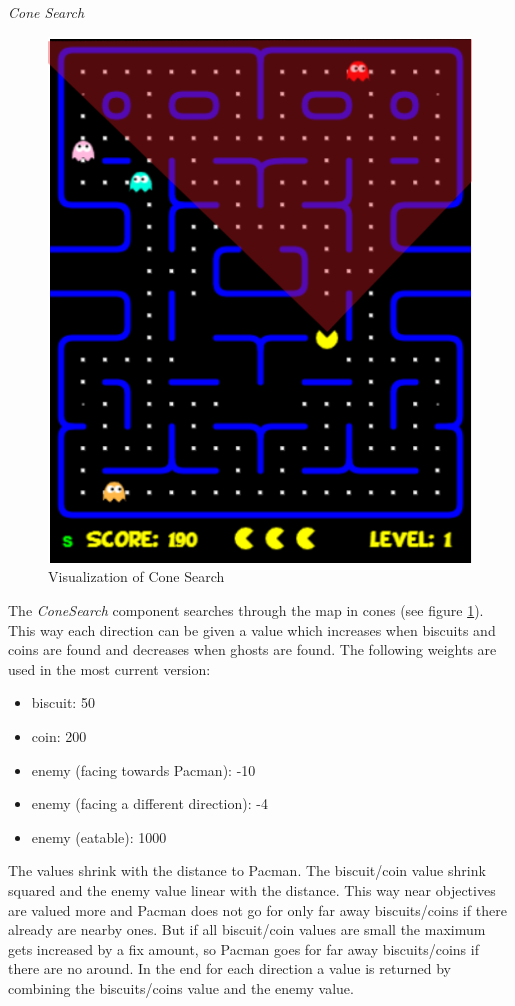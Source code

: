 \emph{Cone Search} \newline
\begin{figure}
	\caption{Visualization of Cone Search}
	\label{fig:cone}
	\centering
	\includegraphics[width=\textwidth]{pictures/Pacman/Cone.png}
\end{figure}
The \textit{ConeSearch} component searches through the map in cones (see figure \ref{fig:cone}). This way each direction can be given a value which increases when biscuits and coins are found and decreases when ghosts are found. The following weights are used in the most current version:
\begin{itemize}
	\item biscuit: 50
	\item coin: 200
	\item enemy (facing towards Pacman): -10
	\item enemy (facing a different direction): -4
	\item enemy (eatable): 1000
\end{itemize}
The values shrink with the distance to Pacman. The biscuit/coin value shrink squared and the enemy value linear with the distance. This way near objectives are valued more and Pacman does not go for only far away biscuits/coins if there already are nearby ones. But if all biscuit/coin values are small the maximum gets increased by a fix amount, so Pacman goes for far away biscuits/coins if there are no around. In the end for each direction a value is returned by combining the biscuits/coins value and the enemy value. 
